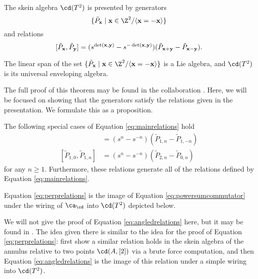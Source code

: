 \begin{theorem} \label{thm:toruspresentation}
The skein algebra $\cd(T^2)$ is presented by generators 
\[
\{ \tilde{P}_\xx \mid \xx \in \Z^2 / \langle \xx = - \xx \rangle \}
\]
and relations
\begin{equation} \label{eq:mainrelations}
[\tilde{P}_{\mathbf{x}}, \tilde{P}_{\mathbf{y}}] = (s^{\det({\mathbf{x}}, {\mathbf{y}})} - s^{-\det({\mathbf{x}}, {\mathbf{y}})}) (\tilde{P}_{{\mathbf{x}} + {\mathbf{y}}} - \tilde{P}_{{\mathbf{x}} - {\mathbf{y}}}).
\end{equation}
\end{theorem}

\begin{corollary} \label{cor:liealgebra1}
The linear span of the set $\{ \tilde{P}_\xx \mid \xx \in \Z^2 / \langle \xx = - \xx \rangle \}$ is a Lie algebra, and  $\cd(T^2)$ is its universal enveloping algebra. 
\end{corollary}

The full proof of this theorem may be found in the collaboration . Here, we will be focused on showing that the generators satisfy the relations given in the presentation. We formulate this as a proposition.
\begin{proposition}
The following special cases of Equation \eqref{eq:mainrelations} hold
\begin{align}
[\tilde{P}_{1, 0}, \tilde{P}_{0, n}] &= (s^n - s^{-n}) (\tilde{P}_{1, n} - \tilde{P}_{1, -n}) \label{eq:perprelations} \\
[\tilde{P}_{1, 0}, \tilde{P}_{1, n}] &= (s^n - s^{-n}) (\tilde{P}_{2, n} - \tilde{P}_{0, n}) \label{eq:angledrelations}
\end{align}
for any $n \geq 1$. Furthermore, these relations generate all of the relations defined by Equation \eqref{eq:mainrelations}.
\end{proposition}

Equation \eqref{eq:perprelations} is the image of Equation \eqref{eq:powersumcommutator} under the wiring of $\ca_\cd$ into $\cd(T^2)$ depicted below.


We will not give the proof of Equation \eqref{eq:angledrelations} here, but it may be found in . The idea given there is similar to the idea for the proof of Equation \eqref{eq:perprelations}: first show a similar relation holds in the skein algebra of the annulus relative to two points $\cd(A, [2])$ via a brute force computation, and then Equation \eqref{eq:angledrelations} is the image of this relation under a simple wiring into $\cd(T^2)$. 

